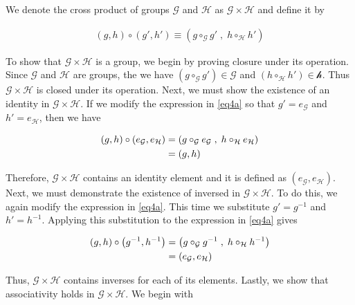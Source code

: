 \documentclass[../CryptoHW3.tex]{subfiles}
\begin{document}
\begin{flushleft}



 We denote the cross product of groups $\mathcal{G}$ and $\mathcal{H}$ as $\mathcal{G} \times \mathcal{H}$ and define it by 

\begin{align}
  \left( g, h \right) \circ \left( g', h' \right) \equiv \left( g \circ_\mathcal{G} g' \; , \; h \circ_\mathcal{H} h' \right) \label{eq4a}
\end{align}

To show that $\mathcal{G} \times \mathcal{H}$ is a group, we begin by proving closure under its operation.  Since $\mathcal{G}$ and $\mathcal{H}$ are groups, the we have $\left( g \circ_\mathcal{G} g' \right) \in \mathcal{G}$ and $\left( h \circ_\mathcal{H} h' \right) \in \mathcal{h}$.  Thus $\mathcal{G} \times \mathcal{H}$ is closed under its operation.  Next, we must show the existence of an identity in $\mathcal{G} \times \mathcal{H}$.  If we modify the expression in \ref{eq4a} so that $g' = e_\mathcal{G}$ and $h' = e_\mathcal{H}$, then we have 

\begin{align}
  \left( g, h \right) \circ \left( e_\mathcal{G}, e_\mathcal{H} \right) &= \left( g \circ_\mathcal{G} e_\mathcal{G} \; , \; h \circ_\mathcal{H} e_\mathcal{H} \right) \notag \\
  &= \left( g, h \right) \notag
\end{align}

Therefore, $\mathcal{G} \times \mathcal{H}$ contains an identity element and it is defined as $\left( e_\mathcal{G}, e_\mathcal{H} \right)$.  Next, we must demonstrate the existence of inversed in $\mathcal{G} \times \mathcal{H}$.  To do this, we again modify the expression in \ref{eq4a}.  This time we substitute $g' = g^{-1}$ and $h' = h^{-1}$.  Applying this substitution to the expression in \ref{eq4a} gives

\begin{align}
  \left( g, h \right) \circ \left( g^{-1}, h^{-1} \right) &= \left( g \circ_\mathcal{G} g^{-1} \; , \; h \circ_\mathcal{H} h^{-1} \right) \notag \\
  &= \left( e_\mathcal{G}, e_\mathcal{H} \right) \notag
\end{align}

Thus, $\mathcal{G} \times \mathcal{H}$ contains inverses for each of its elements.  Lastly, we show that associativity holds in $\mathcal{G} \times \mathcal{H}$.  We begin with


\end{flushleft}
\end{document}
